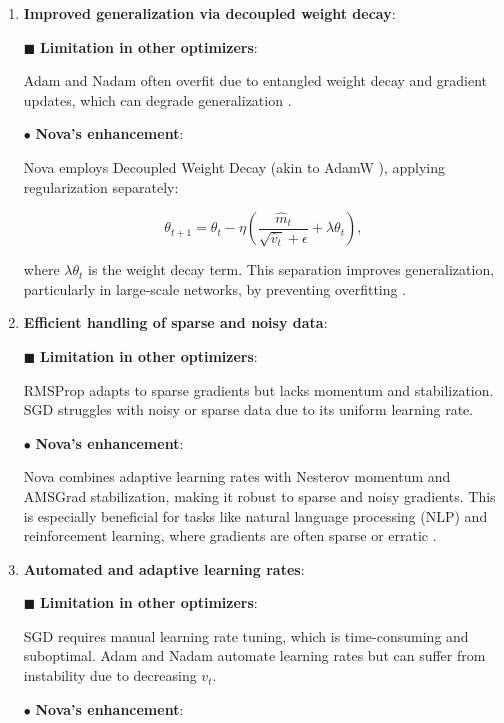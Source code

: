 \documentclass{article}
\begin{document}
\begin{enumerate}
\[
\hat{v}_t = \max(\hat{v}_{t-1}, v_t).
\]


This ensures stable, non-vanishing learning rates, preventing convergence issues in long training runs.

\item {\bf Improved generalization via decoupled weight decay}:

$\blacksquare$ \textbf{Limitation in other optimizers}:

Adam and Nadam often overfit due to entangled weight decay and gradient updates, which can degrade generalization \cite{Loshchilov2017}.

$\bullet$ \textbf{Nova’s enhancement}:

Nova employs Decoupled Weight Decay (akin to AdamW \cite{Loshchilov2017}), applying regularization separately:


\[
\theta_{t+1} = \theta_t - \eta \left( \frac{\hat{m}_t}{\sqrt{\hat{v}_t} + \epsilon} + \lambda \theta_t \right),
\]


where $\lambda \theta_t$ is the weight decay term. This separation improves generalization, particularly in large-scale networks, by preventing overfitting \cite{Zhang2021}.

\item {\bf Efficient handling of sparse and noisy data}:

$\blacksquare$ \textbf{Limitation in other optimizers}:

RMSProp adapts to sparse gradients but lacks momentum and stabilization. SGD struggles with noisy or sparse data due to its uniform learning rate.

$\bullet$ \textbf{Nova’s enhancement}:

Nova combines adaptive learning rates with Nesterov momentum and AMSGrad stabilization, making it robust to sparse and noisy gradients. This is especially beneficial for tasks like natural language processing (NLP) and reinforcement learning, where gradients are often sparse or erratic \cite{Johnson2020}.

\item {\bf Automated and adaptive learning rates}:

$\blacksquare$ \textbf{Limitation in other optimizers}:

SGD requires manual learning rate tuning, which is time-consuming and suboptimal. Adam and Nadam automate learning rates but can suffer from instability due to decreasing $v_t$.

$\bullet$ \textbf{Nova’s enhancement}:


\end{enumerate}
\end{document}
